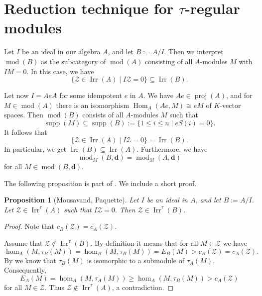 \documentclass[12pt,reqno]{amsart}
\newtheorem{Prop}[Thm]{Proposition}
\theoremstyle{definition}
\newcommand{\bd}{\mathbf{d}}
\newcommand{\md}{\operatorname{mod}}
\newcommand{\supp}{\operatorname{supp}}
\newcommand{\proj}{\operatorname{proj}}
\newcommand{\Hom}{\operatorname{Hom}}
\newcommand{\irr}{\operatorname{Irr}}
\newcommand{\calZ}{\mathcal{Z}}
\begin{document}

\section{Reduction technique for $\tau$-regular modules}\label{sec:reduction}


Let $I$ be an ideal in our algebra $A$, and let $B := A/I$.
Then we interpret $\md(B)$ as the subcategory
of $\md(A)$ consisting of all $A$-modules $M$ with
$IM = 0$.
In this case, we have
$$
\{ \calZ \in \irr(A) \mid I\calZ = 0 \} \subseteq \irr(B).
$$

Let now $I = AeA$ for some idempotent $e$ in $A$.
We have $Ae \in \proj(A)$, and for $M \in \md(A)$
there is an isomorphism
$\Hom_A(Ae,M) \cong eM$ of $K$-vector spaces.
Then
$\md(B)$ consists of
all $A$-modules $M$ such that
$$
\supp(M) \subseteq \supp(B) :=
\{ 1 \le i \le n \mid eS(i) = 0 \}.
$$
It follows that
$$
\{ \calZ \in \irr(A) \mid I\calZ = 0 \} = \irr(B).
$$
In particular, we get $\irr(B) \subseteq \irr(A)$.
Furthermore, we have
$$
\md_M(B,\bd) = \md_M(A,\bd)
$$
for all $M \in \md(B,\bd)$.

The following proposition is part of \cite[Proposition~5.2]{MP23}.
We include a short proof.

\begin{Prop}[{Mousavand, Paquette}]\label{prop:MP23}
Let $I$ be an ideal in $A$, and let $B:= A/I$.
Let $\calZ \in \irr^\tau(A)$ such that $I\calZ = 0$.
Then $\calZ \in \irr^\tau(B)$.
\end{Prop}

\begin{proof}
Note that $c_B(\calZ) = c_A(\calZ)$.

Assume that $\calZ \notin \irr^\tau(B)$.
By definition it means that for all $M \in \calZ$ we have
$$
\hom_A(M,\tau_B(M)) = \hom_B(M,\tau_B(M)) = E_B(M)
> c_B(\calZ) = c_A(\calZ).
$$
By \cite[Proposition~4.2]{AR77} we know that $\tau_B(M)$ is isomorphic
to a submodule of $\tau_A(M)$.
Consequently,
\[
E_A(M) = \hom_A(M,\tau_A(M)) \geq \hom_A(M,\tau_B(M)) > c_A(\calZ)
\]
for all $M \in \calZ$.
Thus $\calZ \notin \irr^\tau(A)$, a contradiction.
\end{proof}
\end{document}
